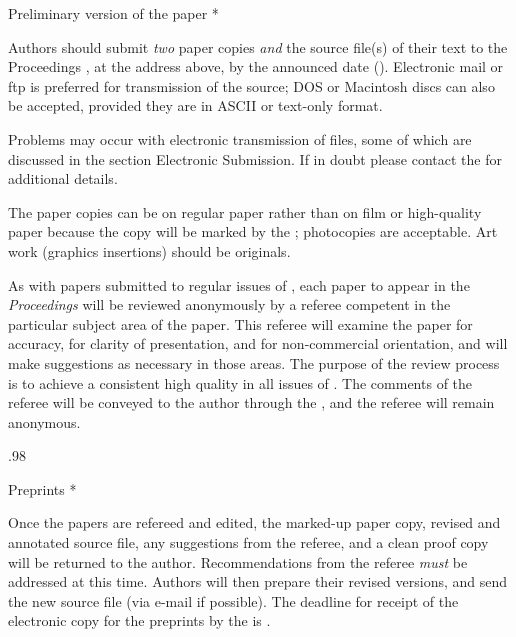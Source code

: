 \endfigure

\subhead * Preliminary version of the paper *

Authors should submit {\it two\/} paper copies {\it and\/} the source
file(s) of their text to the Proceedings \Editor, at the address above, by
the announced date ({\bf \PrelimDeadline}). Electronic mail or ftp is
preferred for transmission of the source; {\SMC DOS} or Macintosh discs
can also be accepted, provided they are in {\SMC ASCII} or text-only
format.

Problems may occur with electronic transmission of files, some of which
are discussed in the section Electronic Submission.
If in doubt please contact the \editor{} for additional details.

The paper copies can be on regular paper rather than on
film or high-quality paper because the copy will be marked by the
\editor; photocopies are acceptable.
Art work (graphics insertions) should be originals.

As with papers submitted to regular issues of \TUB, each paper to appear
in the {\sl Proceedings\/} will be reviewed anonymously by a referee
competent in the particular subject area of the paper.  This referee will
examine the paper for accuracy, for clarity of presentation, and for
non-commercial orientation, and will make suggestions as necessary in
those areas.  The purpose of the review process is to achieve a
consistent high quality in all issues of \TUB.  The comments of the
referee will be conveyed to the author through the \editor, and the
referee will remain anonymous.

\baselineskip.98\baselineskip


\subhead * Preprints *

Once the papers are refereed and edited, the marked-up paper copy,
revised and annotated source file, any suggestions from the referee, and
a clean proof copy will be returned to the author.  Recommendations from
the referee {\it must\/} be addressed at this time.  Authors will then
prepare their revised versions, and send the new source file (via e-mail
if possible).  The deadline for receipt of the electronic
copy for the preprints by the \editor{} is {\bf \PreprintDeadline}.

